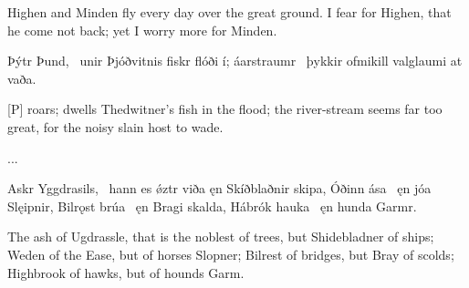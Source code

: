 \bvb Highen and Minden fly every day over the great ground. I fear for Highen, that he come not back; yet I worry more for Minden.\evb
\evg


\bvg
\bva Þýtr Þund, \hld\ unir Þjóðvitnis
\ind fiskr flóði í;
áarstraumr \hld\ þykkir ofmikill
\ind valglaumi at vaða.\eva

\bvb {}[P] roars; dwells Thedwitner’s fish in the flood; the river-stream seems far too great, for the noisy slain host to wade.\evb
\evg


...


\bvg
\bva Askr Yggdrasils, \hld\ hann es ǿztr viða
\ind ęn Skíðblaðnir skipa,
Óðinn ása \hld\ ęn jóa Slęipnir,
Bilrǫst brúa \hld\ ęn Bragi skalda,
Hábrók hauka \hld\ ęn hunda Garmr.\eva

\bvb The ash of Ugdrassle, that is the noblest of trees, but Shidebladner of ships; Weden of the Ease, but of horses Slopner; Bilrest of bridges, but Bray of scolds; Highbrook of hawks, but of hounds Garm.\evb
\evg
